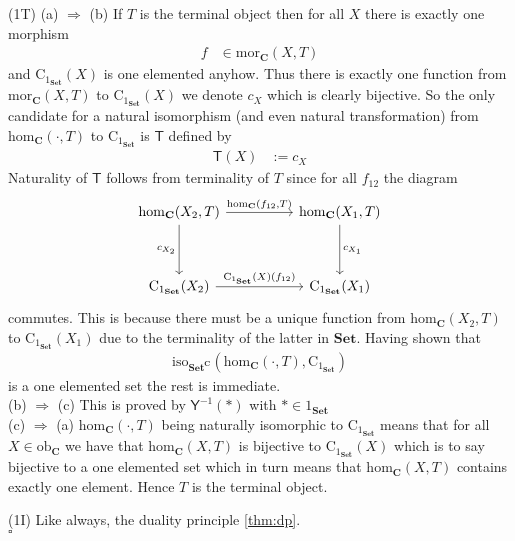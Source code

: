 \begin{prf}
\item[(1T)]
{\glqq}(a) $\Rightarrow$ (b){\grqq}
\qquad
If $T$ is the terminal object then for all $X$ there is exactly one morphism
\begin{align*}
  f
  &\in
  \mathrm{mor}_{\mathbf{C}}(X,T)
\end{align*}
and $\mathrm{C}_{1_{\mathbf{Set}}}(X)$ is one elemented anyhow. Thus there is exactly one function from $\mathrm{mor}_{\mathbf{C}}(X,T)$ to $\mathrm{C}_{1_{\mathbf{Set}}}(X)$ we denote $c_{X}$ which is clearly bijective. So the only candidate for a natural isomorphism (and even natural transformation) from $\mathrm{hom}_{\mathbf{C}}(\cdot,T)$ to $\mathrm{C}_{1_{\mathbf{Set}}}$ is $\mathsf{T}$ defined by
\begin{align*}
  \mathsf{T}(X)
  &:=
  c_{X}
\end{align*}
Naturality of $\mathsf{T}$ follows from terminality of $T$ since for all $f_{12}$ the diagram
\[
\begin{tikzcd}[sep=huge]
  \mathrm{hom}_{\mathbf{C}}(X_{2},T)
  \arrow[swap]{d}{c_{X_{2}}}
  \arrow{r}{\mathrm{hom}_{\mathbf{C}}(f_{12},T)}
  &
  \mathrm{hom}_{\mathbf{C}}(X_{1},T)
  \arrow{d}{c_{X_{1}}}
  \\
  \mathrm{C}_{1_{\mathbf{Set}}}(X_{2})
  \arrow{r}{\mathrm{C}_{1_{\mathbf{Set}}}(X)(f_{12})}
  &
  \mathrm{C}_{1_{\mathbf{Set}}}(X_{1})
\end{tikzcd}
\]
commutes. This is because there must be a unique function from $\mathrm{hom}_{\mathbf{C}}(X_{2},T)$ to $\mathrm{C}_{1_{\mathbf{Set}}}(X_{1})$ due to the terminality of the latter in $\mathbf{Set}$. Having shown that
\begin{align*}
  \mathrm{iso}_{\mathbf{Set}^{\mathbf{C}}}
  \left(
    \mathrm{hom}_{\mathbf{C}}(\cdot,T),
    \mathrm{C}_{1_{\mathbf{Set}}}
  \right)
\end{align*}
is a one elemented set the rest is immediate.
\\
{\glqq}(b) $\Rightarrow$ (c){\grqq}
\qquad
This is proved by $\mathsf{Y}^{-1}(\ast)$ with $\ast \in 1_{\mathbf{Set}}$
\\
{\glqq}(c) $\Rightarrow$ (a){\grqq}
\qquad
$\mathrm{hom}_{\mathbf{C}}(\cdot,T)$ being naturally isomorphic to $\mathrm{C}_{1_{\mathbf{Set}}}$ means that for all $X \in \mathrm{ob}_{\mathbf{C}}$ we have that $\mathrm{hom}_{\mathbf{C}}(X,T)$ is bijective to $\mathrm{C}_{1_{\mathbf{Set}}}(X)$ which is to say bijective to a one elemented set which in turn means that $\mathrm{hom}_{\mathbf{C}}(X,T)$ contains exactly one element. Hence $T$ is the terminal object.
\item[(1I)]
Like always, the duality principle \ref{thm:dp}.
\\
\phantom{proven}
\hfill
$\square$
\end{prf}
